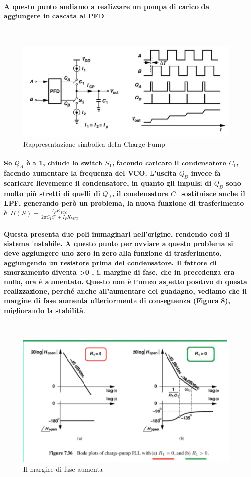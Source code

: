 \documentclass{article}
\begin{document}
\paragraph{A questo punto andiamo a realizzare un pompa di carico da aggiungere in cascata al PFD}
~\begin{figure}[!h]%
\includegraphics[scale=0.6]{CP.png} 
\caption{Rappresentazione simbolica della Charge Pump}
\label{fig:foo}
\end{figure}
\paragraph{Se $Q_A$ è a 1, chiude lo switch $S_1$, facendo caricare il condensatore $C_1$, facendo aumentare la frequenza del VCO.
L'uscita $Q_B$ invece fa scaricare lievemente il condensatore, in quanto gli impulsi di $Q_B$ sono molto più stretti di quelli di $Q_A$, il condensatore $C_1$ sostituisce anche il LPF, generando però un problema, la nuova funzione di trasferimento è $H(S)=\frac{I_PK_{VCO}}{2\pi C_1S^2+I_PK_{VCO}}$}

\paragraph{Questa presenta due poli immaginari nell'origine, rendendo così il sistema instabile. A questo punto per ovviare a questo problema si deve  aggiungere uno zero in zero alla funzione di trasferimento, aggiungendo un resistore prima del condensatore.
Il fattore di smorzamento diventa \textgreater 0 , il margine di fase, che in precedenza era nullo, ora è aumentato.  
Questo non è l'unico aspetto positivo di questa realizzazione, perché anche all'aumentare del guadagno, vediamo che il margine di fase aumenta ulteriormente di conseguenza (Figura 8), migliorando la stabilità.}
~\begin{figure}[!h]%
\includegraphics[scale=0.8]{ZPFD.png} 
\caption{Il margine di fase aumenta}
\label{fig:foo}
\end{figure}
\end{document}

